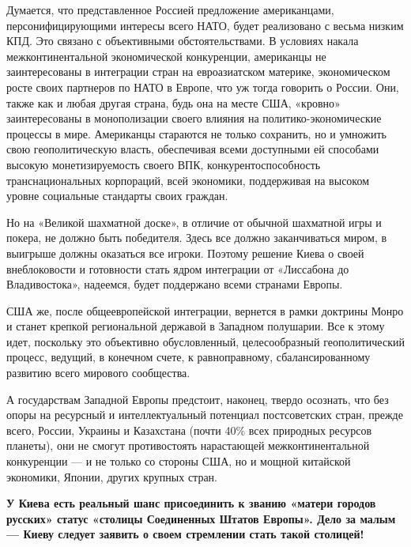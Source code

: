 Думается, что представленное Россией предложение американцами,
персонифицирующими интересы всего НАТО, будет реализовано с весьма низким КПД.
Это связано с объективными обстоятельствами. В условиях накала
межконтинентальной экономической конкуренции, американцы не заинтересованы в
интеграции стран на евроазиатском материке, экономическом росте своих партнеров
по НАТО в Европе, что уж тогда говорить о России. Они, также как и любая другая
страна, будь она на месте США, «кровно» заинтересованы в монополизации своего
влияния на политико-экономические процессы в мире. Американцы стараются не
только сохранить, но и умножить свою геополитическую власть, обеспечивая всеми
доступными ей способами высокую монетизируемость своего ВПК,
конкурентоспособность транснациональных корпораций, всей экономики, поддерживая
на высоком уровне социальные стандарты своих граждан.

Но на «Великой шахматной доске», в отличие от обычной шахматной игры и покера,
не должно быть победителя. Здесь все должно заканчиваться миром, в выигрыше
должны оказаться все игроки. Поэтому решение Киева о своей внеблоковости и
готовности стать ядром интеграции от «Лиссабона до Владивостока», надеемся,
будет поддержано всеми странами Европы.

США же, после общеевропейской интеграции, вернется в рамки доктрины Монро и
станет крепкой региональной державой в Западном полушарии. Все к этому идет,
поскольку это объективно обусловленный, целесообразный геополитический процесс,
ведущий, в конечном счете, к равноправному, сбалансированному развитию всего
мирового сообщества.

А государствам Западной Европы предстоит, наконец, твердо осознать, что без
опоры на ресурсный и интеллектуальный потенциал постсоветских стран, прежде
всего, России, Украины и Казахстана (почти 40\% всех природных ресурсов
планеты), они не смогут противостоять нарастающей межконтинентальной
конкуренции — и не только со стороны США, но и мощной китайской экономики,
Японии, других крупных стран.

\textbf{У Киева есть реальный шанс присоединить к званию «матери городов русских»
статус «столицы Соединенных Штатов Европы». Дело за малым — Киеву следует
заявить о своем стремлении стать такой столицей!}
